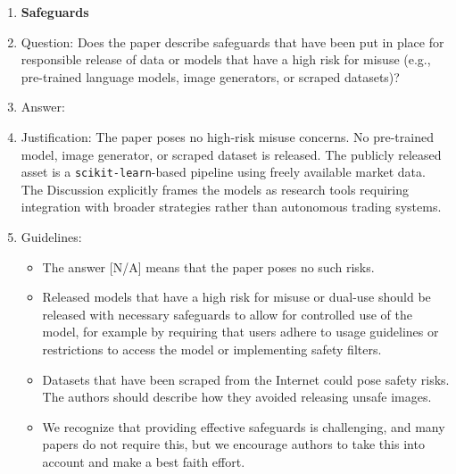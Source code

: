 \documentclass{article}
\begin{document}
\begin{enumerate}
\item {\bf Safeguards}
    \item[] Question: Does the paper describe safeguards that have been put in place for responsible
release of data or models that have a high risk for misuse (e.g., pre-trained language models,
image generators, or scraped datasets)?
    \item[] Answer: \answerNA{}
    \item[] Justification: The paper poses no high-risk misuse concerns. No pre-trained model,
    image generator, or scraped dataset is released. The publicly released asset is a
    \texttt{scikit-learn}-based pipeline using freely available market data. The Discussion
    explicitly frames the models as research tools requiring integration with broader strategies
    rather than autonomous trading systems.
    \item[] Guidelines:
    \begin{itemize}
        \item The answer [N/A] means that the paper poses no such risks.
        \item Released models that have a high risk for misuse or dual-use should be released with
necessary safeguards to allow for controlled use of the model, for example by requiring
that users adhere to usage guidelines or restrictions to access the model or implementing
safety filters.
        \item Datasets that have been scraped from the Internet could pose safety risks. The authors
should describe how they avoided releasing unsafe images.
        \item We recognize that providing effective safeguards is challenging, and many papers do
not require this, but we encourage authors to take this into account and make a best
faith effort.
    \end{itemize}


\end{enumerate}
\end{document}
